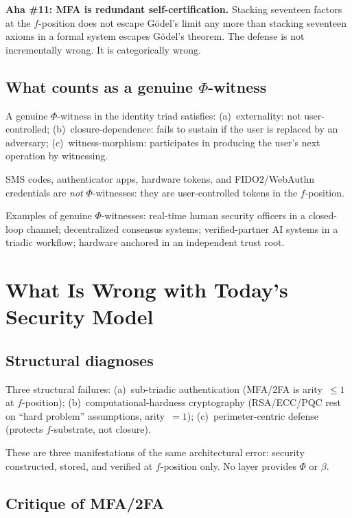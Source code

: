 \documentclass[11pt,a4paper]{article}
\theoremstyle{definition}
\theoremstyle{remark}
\newcommand{\aha}[2]{\medskip\textbf{Aha \##1: #2}}
\begin{document}
\aha{11}{MFA is redundant self-certification.} Stacking seventeen factors at the $f$-position does not escape G\"odel's limit any more than stacking seventeen axioms in a formal system escapes G\"odel's theorem. The defense is not incrementally wrong. It is categorically wrong.

\subsection{What counts as a genuine \texorpdfstring{$\Phi$}{Phi}-witness}

A genuine $\Phi$-witness in the identity triad satisfies: (a)~externality: not user-controlled; (b)~closure-dependence: fails to sustain if the user is replaced by an adversary; (c)~witness-morphism: participates in producing the user's next operation by witnessing.

SMS codes, authenticator apps, hardware tokens, and FIDO2/WebAuthn credentials are \emph{not} $\Phi$-witnesses: they are user-controlled tokens in the $f$-position.

Examples of genuine $\Phi$-witnesses: real-time human security officers in a closed-loop channel; decentralized consensus systems; verified-partner AI systems in a triadic workflow; hardware anchored in an independent trust root.

\section{What Is Wrong with Today's Security Model}

\subsection{Structural diagnoses}

Three structural failures: (a)~sub-triadic authentication (MFA/2FA is arity~$\leq 1$ at $f$-position); (b)~computational-hardness cryptography (RSA/ECC/PQC rest on ``hard problem'' assumptions, arity~$= 1$); (c)~perimeter-centric defense (protects $f$-substrate, not closure).

These are three manifestations of the same architectural error: security constructed, stored, and verified at $f$-position only. No layer provides $\Phi$ or $\beta$.

\subsection{Critique of MFA/2FA}
\end{document}
